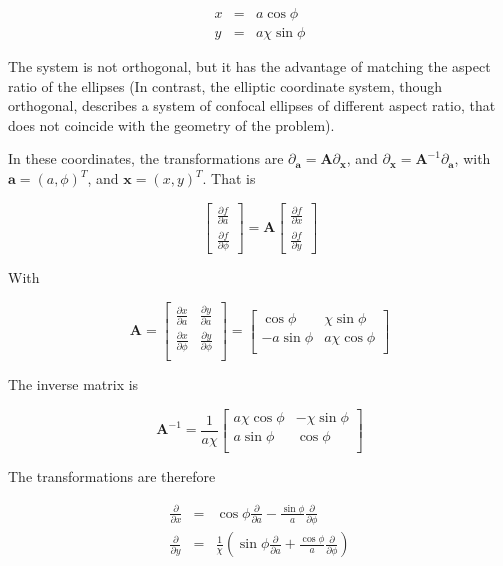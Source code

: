 \documentclass[useAMS,8pt,twocolumn]{article}
\newcommand{\pderiv}[2]{\frac{\partial #1}{\partial #2}}
\newcommand{\vt}[1]{\mathbf{#1}}       %
\renewcommand{\v}[1]{{\boldsymbol{#1}}} %
\newcommand{\beq}{\begin{equation}}
\newcommand{\eeq}{\end{equation}}
\newcommand{\beqn}{\begin{eqnarray}}
\newcommand{\eeqn}{\end{eqnarray}}
\begin{document}
\beqn
  x &=& a \cos\phi \\
  y &=& a\chi\sin\phi
\eeqn

The system is not orthogonal, but it has the advantage of matching the
aspect ratio of the ellipses (In contrast, the elliptic coordinate
system, though orthogonal, describes a system of confocal ellipses of
different aspect ratio, that does not coincide with the geometry of
the problem). 

In these coordinates, the transformations are $\partial_\v{a} =
\vt{A} \partial_\v{x}$, and $\partial_\v{x} =
\vt{A}^{-1} \partial_\v{a}$, with $\v{a} = (a,\phi)^T$, and $\v{x} =
(x,y)^T$. That is

\beq
\left[\begin{array}{c}
    \pderiv{f}{a}  \\
    \pderiv{f}{\phi}
  \end{array}\right] = \vt{A} 
  \left[\begin{array}{c}
      \pderiv{f}{x}  \\
      \pderiv{f}{y}
    \end{array}\right] 
\eeq

With 

\beq
\vt{A} = \left[\begin{array}{cc}
\pderiv{x}{a}  & \pderiv{y}{a}  \\
\pderiv{x}{\phi}  & \pderiv{y}{\phi} \\
\end{array}\right] = \left[\begin{array}{cc}
\cos\phi  & \chi\sin\phi  \\
-a\sin\phi  & a\chi\cos\phi \\
\end{array}\right] 
\eeq

The inverse matrix is 

\beq
\vt{A}^{-1} = \frac{1}{a\chi} \left[\begin{array}{cc}
a\chi\cos\phi  & -\chi\sin\phi  \\
a\sin\phi  & \cos\phi \\
\end{array}\right]  
\eeq

The transformations are therefore

\beqn
\pderiv{}{x} &=& \cos\phi \pderiv{}{a} - \frac{\sin\phi}{a} \pderiv{}{\phi} \\
\pderiv{}{y} &=& \frac{1}{\chi}\left(\sin\phi \pderiv{}{a} + \frac{\cos\phi}{a} \pderiv{}{\phi} \right)
\eeqn
\end{document}
